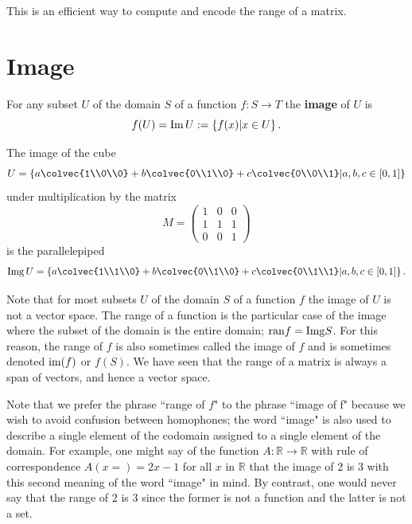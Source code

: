 \noindent
This is an efficient way to compute and encode the range of a matrix.

\section{Image} 

\begin{definition}
For any subset $U$ of the domain $S$ of a function $f:S\to T$  the {\bf image} of $U$ is 
\[f(U)={\rm Im} \,U:= \left\{  f(x) | x\in U \right\} .\]
\end{definition}

\begin{example} 
The image of the  cube
\[U= \left\{  a \colvec{1\\0\\0} +b \colvec{0\\1\\0}+c\colvec{0\\0\\1} \middle| a,b,c \in [0,1] \right\} \] 
under multiplication by the matrix 
\[ M=
\begin{pmatrix}
1&0&0\\
1&1&1\\
0&0&1
\end{pmatrix}
\]
is the parallelepiped 
\[
{\rm Img}\,U= 
 \left\{  a \colvec{1\\1\\0} +b \colvec{0\\1\\0}+c\colvec{0\\1\\1} \middle| a,b,c \in [0,1] \right\} .
\]
\end{example}

Note that for most subsets $U$ of the domain $S$  of a function  $f$ the image of $U$ is not a vector space. 
The range of a function is the particular case of the image where the subset of the domain is the entire domain; ${\rm ran} f = {\rm Img} S$. 
For this reason, the range of $f$ is also sometimes called the {image} of $f$ and is sometimes denoted ${ \rm im}(f)$ or  $f(S).$  We have seen that the range of a matrix is always a span of vectors, and hence a vector space. 

Note that we prefer the phrase ``range of $f$" to the phrase ``image of f"  
because we wish to avoid confusion between homophones;
 the word 
``image" is also used to describe a single element of the codomain assigned to a single element of the domain. 
For example, 
one might say of 
the function $A:\mathbb{R}\to\mathbb{R}$ with rule of correspondence $A(x=)=2x-1$ for all $x$ in $\mathbb{R}$ that the image of $2$ is $3$ with this second meaning of the word ``image" in mind. 
By contrast, one would never say that the range of $2$ is $3$ since the former is not a function and the latter is not a set.



